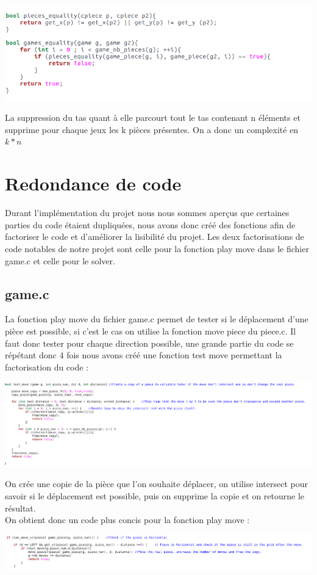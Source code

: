 \documentclass{article}
\begin{document}
\begin{flushleft}
\includegraphics[scale=0.45]{egalitejeux.png}
\end{flushleft}

La suppression du tas quant à elle parcourt tout le tas contenant n éléments et supprime pour chaque jeux les k pièces présentes. On a donc un complexité en $k * n$

\section {Redondance de code}
Durant l'implémentation du projet nous nous sommes aperçus que certaines parties du code étaient dupliquées, nous avons donc créé des fonctions afin de factoriser le code et d'améliorer la lisibilité du projet. Les deux factorisations de code notables de notre projet sont celle pour la fonction play move dans le fichier game.c et celle pour le solver.
\subsection {game.c}
La fonction play move du fichier game.c permet de tester si le déplacement d'une pièce est possible, si c'est le cas on utilise la fonction move piece du piece.c. Il faut donc tester pour chaque direction possible, une grande partie du code se répétant donc 4 fois nous avons créé une fonction test move permettant la factorisation du code :
\begin{flushleft}
\includegraphics[scale=0.45]{test_move.png}
\end{flushleft}
On crée une copie de la pièce que l'on souhaite déplacer, on utilise intersect pour savoir si le déplacement est possible, puis on supprime la copie et on retourne le résultat.\\ 
On obtient donc un code plus concis pour la fonction play move : 
\begin{flushleft}
\includegraphics[scale=0.45]{play_move.png}
\end{flushleft}
\end{document}
